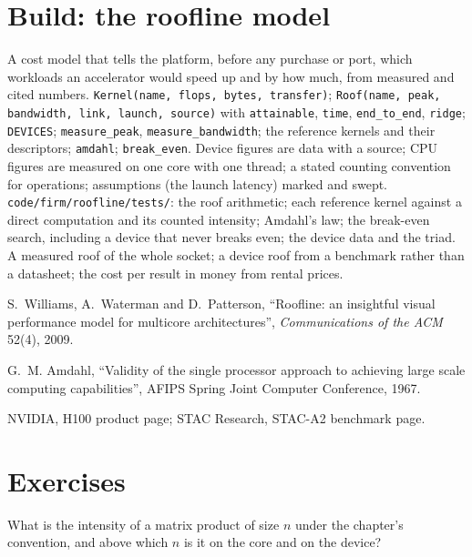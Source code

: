 \section{Build: the roofline model}\label{bld:pl:accelerators-for-quantitative-work:roofline}

\begin{build}
 A cost model that tells the platform, before any purchase or port, which workloads an accelerator would speed up and by how
much, from measured and cited numbers.
 \texttt{Kernel(name, flops, bytes, transfer)}; \texttt{Roof(name, peak, bandwidth, link, launch, source)} with
\texttt{attainable}, \texttt{time}, \texttt{end\_to\_end}, \texttt{ridge}; \texttt{DEVICES}; \texttt{measure\_peak},
\texttt{measure\_bandwidth}; the reference kernels and their descriptors; \texttt{amdahl}; \texttt{break\_even}.
 Device figures are data with a source; CPU figures are measured on one core with one thread; a stated counting convention for
operations; assumptions (the launch latency) marked and swept.
 \texttt{code/firm/roofline/tests/}: the roof arithmetic; each reference kernel against a direct computation and its
counted intensity; Amdahl's law; the break-even search, including a device that never breaks even; the device data and the triad.
 A measured roof of the whole socket; a device roof from a benchmark rather than a datasheet; the cost per result in money
from rental prices.
\end{build}

\begin{omsources}
\item S.~Williams, A.~Waterman and D.~Patterson, ``Roofline: an insightful visual performance model for multicore architectures'',
\emph{Communications of the ACM} 52(4), 2009.
\item G.~M. Amdahl, ``Validity of the single processor approach to achieving large scale computing capabilities'', AFIPS Spring Joint
Computer Conference, 1967.
\item NVIDIA, H100 product page; STAC Research, STAC-A2 benchmark page.
\end{omsources}

\section{Exercises}

\begin{exercise}[$\star$]\label{exo:pl:accelerators-for-quantitative-work:1}
What is the intensity of a matrix product of size $n$ under the chapter's convention, and above which $n$ is it  on the core and
on the device?
\end{exercise}

